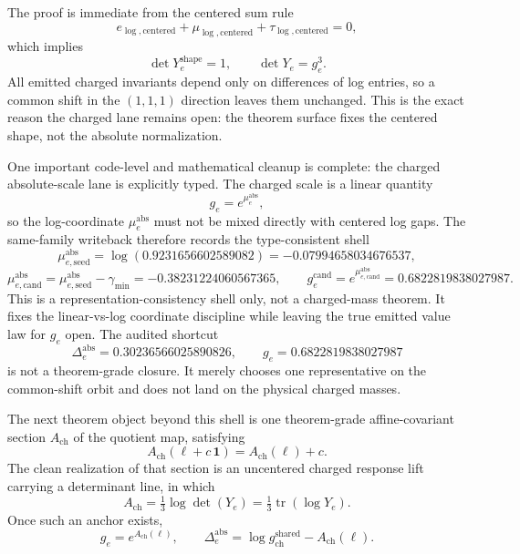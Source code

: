 \documentclass[11pt]{article}
\begin{document}
The proof is immediate from the centered sum rule
\[
e_{\log,\mathrm{centered}}+\mu_{\log,\mathrm{centered}}+\tau_{\log,\mathrm{centered}}=0,
\]
which implies
\[
\det Y_e^{\mathrm{shape}}=1,
\qquad
\det Y_e = g_e^3.
\]
All emitted charged invariants depend only on differences of log entries, so a common shift in the
\((1,1,1)\) direction leaves them unchanged. This is the exact reason the charged lane remains open:
the theorem surface fixes the centered shape, not the absolute normalization.

One important code-level and mathematical cleanup is complete: the charged absolute-scale
lane is explicitly typed. The charged scale is a linear quantity
\[
g_e = e^{\mu_e^{\mathrm{abs}}},
\]
so the log-coordinate \(\mu_e^{\mathrm{abs}}\) must not be mixed directly with centered log gaps.
The same-family writeback therefore records the type-consistent shell
\[
\mu_{e,\mathrm{seed}}^{\mathrm{abs}} = \log(0.9231656602589082) = -0.07994658034676537,
\]
\[
\mu_{e,\mathrm{cand}}^{\mathrm{abs}}
=
\mu_{e,\mathrm{seed}}^{\mathrm{abs}}-\gamma_{\min}
=
-0.38231224060567365,
\qquad
g_e^{\mathrm{cand}} = e^{\mu_{e,\mathrm{cand}}^{\mathrm{abs}}}=0.6822819838027987.
\]
This is a representation-consistency shell only, not a charged-mass theorem. It fixes the
linear-vs-log coordinate discipline while leaving the true emitted value law for \(g_e\) open.
The audited shortcut
\[
\Delta_e^{\mathrm{abs}}=0.30236566025890826,
\qquad
g_e=0.6822819838027987
\]
is not a theorem-grade closure. It merely chooses one representative on the common-shift orbit and
does not land on the physical charged masses.

The next theorem object beyond this shell is one
theorem-grade affine-covariant section \(A_{\mathrm{ch}}\) of the quotient map, satisfying
\[
A_{\mathrm{ch}}(\ell + c\,\mathbf 1)=A_{\mathrm{ch}}(\ell)+c.
\]
The clean realization of that section is an uncentered charged response lift carrying a
determinant line, in which
\[
A_{\mathrm{ch}}=\tfrac13 \log \det(Y_e)=\tfrac13 \operatorname{tr}(\log Y_e).
\]
Once such an anchor exists,
\[
g_e = e^{A_{\mathrm{ch}}(\ell)},
\qquad
\Delta_e^{\mathrm{abs}} = \log g_{\mathrm{ch}}^{\mathrm{shared}} - A_{\mathrm{ch}}(\ell).
\]
\end{document}
